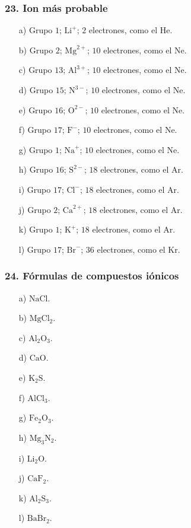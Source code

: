 \subsubsection*{23. Ion más probable}
\begin{enumerate}
    \item[a)] Grupo $1$; $\mathrm{Li}^{+}$;
    $2$ electrones, como el He.
    \item[b)] Grupo $2$; $\mathrm{Mg}^{2+}$;
    $10$ electrones, como el Ne.
    \item[c)] Grupo $13$; $\mathrm{Al}^{3+}$;
    $10$ electrones, como el Ne.
    \item[d)] Grupo $15$; $\mathrm{N}^{3-}$;
    $10$ electrones, como el Ne.
    \item[e)] Grupo $16$; $\mathrm{O}^{2-}$;
    $10$ electrones, como el Ne.
    \item[f)] Grupo $17$; $\mathrm{F}^{-}$;
    $10$ electrones, como el Ne.
    \item[g)] Grupo $1$; $\mathrm{Na}^{+}$;
    $10$ electrones, como el Ne.
    \item[h)] Grupo $16$; $\mathrm{S}^{2-}$;
    $18$ electrones, como el Ar.
    \item[i)] Grupo $17$; $\mathrm{Cl}^{-}$;
    $18$ electrones, como el Ar.
    \item[j)] Grupo $2$; $\mathrm{Ca}^{2+}$;
    $18$ electrones, como el Ar.
    \item[k)] Grupo $1$; $\mathrm{K}^{+}$;
    $18$ electrones, como el Ar.
    \item[l)] Grupo $17$; $\mathrm{Br}^{-}$;
    $36$ electrones, como el Kr.
\end{enumerate}

\subsubsection*{24. Fórmulas de compuestos iónicos}
\begin{enumerate}
    \item[a)] $\mathrm{NaCl}$.
    \item[b)] $\mathrm{MgCl_2}$.
    \item[c)] $\mathrm{Al_2O_3}$.
    \item[d)] $\mathrm{CaO}$.
    \item[e)] $\mathrm{K_2S}$.
    \item[f)] $\mathrm{AlCl_3}$.
    \item[g)] $\mathrm{Fe_2O_3}$.
    \item[h)] $\mathrm{Mg_3N_2}$.
    \item[i)] $\mathrm{Li_2O}$.
    \item[j)] $\mathrm{CaF_2}$.
    \item[k)] $\mathrm{Al_2S_3}$.
    \item[l)] $\mathrm{BaBr_2}$.
\end{enumerate}

